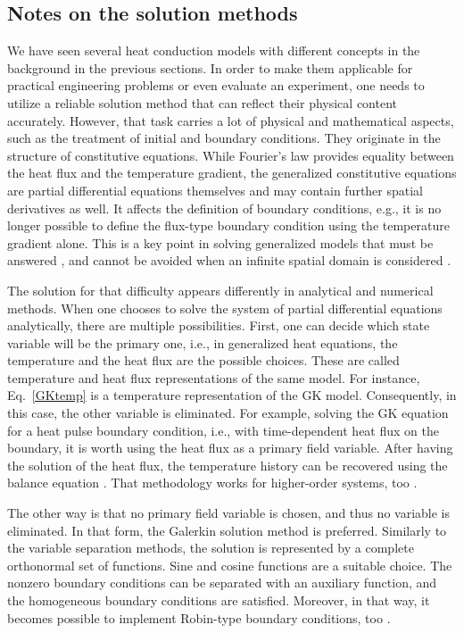 \documentclass[sn-mathphys]{sn-jnl}%
\theoremstyle{thmstyleone}%
\theoremstyle{thmstyletwo}%
\theoremstyle{thmstylethree}%
\begin{document}
{%
\subsection{Notes on the solution methods}
We have seen several heat conduction models with different concepts in the background in the previous sections. In order to make them applicable for practical engineering problems or even evaluate an experiment, one needs to utilize a reliable solution method that can reflect their physical content accurately. However, that task carries a lot of physical and mathematical aspects, such as the treatment of initial and boundary conditions. They originate in the structure of constitutive equations. While Fourier's law provides equality between the heat flux and the temperature gradient, the generalized constitutive equations are partial differential equations themselves and may contain further spatial derivatives as well. It affects the definition of boundary conditions, e.g., it is no longer possible to define the flux-type boundary condition using the temperature gradient alone. This is a key point in solving generalized models that must be answered \cite{Kov18gk, BallEtal20, FehKov21}, and cannot be avoided when an infinite spatial domain is considered \cite{Zhu16a, ZhuSri17, Zhu16b}.

{The solution for that difficulty appears differently in analytical and numerical methods. When one chooses to solve the system of partial differential equations analytically, there are multiple possibilities. First, one can decide which state variable will be the primary one, i.e., in generalized heat equations, the temperature and the heat flux are the possible choices. These are called temperature and heat flux representations of the same model. For instance, Eq.~\eqref{GKtemp} is a temperature representation of the GK model. Consequently, in this case, the other variable is eliminated. For example, solving the GK equation for a heat pulse boundary condition, i.e., with time-dependent heat flux on the boundary, it is worth using the heat flux as a primary field variable. After having the solution of the heat flux, the temperature history can be recovered using the balance equation \cite{Kov18gk}. That methodology works for higher-order systems, too \cite{BallEtal20}.

The other way is that no primary field variable is chosen, and thus no variable is eliminated. In that form, the Galerkin solution method is preferred. Similarly to the variable separation methods, the solution is represented by a complete orthonormal set of functions. Sine and cosine functions are a suitable choice. The nonzero boundary conditions can be separated with an auxiliary function, and the homogeneous boundary conditions are satisfied. Moreover, in that way, it becomes possible to implement Robin-type boundary conditions, too \cite{FehKov21}.

}}
\end{document}
